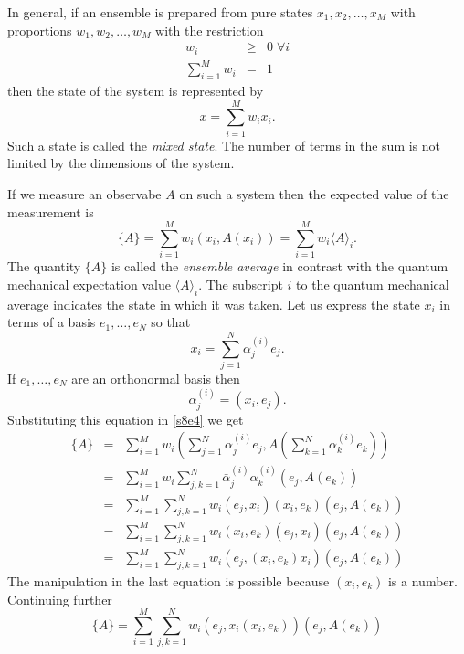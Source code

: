 \documentclass{article}
\numberwithin{equation}{section}
\newcommand{\qev}[1]{\langle #1 \rangle} %
\newcommand{\eav}[1]{\{ #1 \}}           %
\theoremstyle{plain}
\numberwithin{thm}{section}
\theoremstyle{plain}
\numberwithin{prop}{section}
\theoremstyle{definition}
\numberwithin{defn}{section}
\theoremstyle{remark}
\begin{document}
In general, if an ensemble is prepared from pure states $x_1, x_2, \ldots, x_M$
with proportions $w_1, w_2, \ldots, w_M$ with the restriction 
\begin{eqnarray}
w_i &\ge& 0 \;\forall i \label{s8e1} \\
\sum_{i=1}^M w_i &=& 1 \label{s8e2}
\end{eqnarray}
then the state of the system is represented by
\begin{equation}\label{s8e3}
x = \sum_{i=1}^M w_i x_i.
\end{equation}
Such a state is called the \emph{mixed state}. The number of terms in the sum
is not limited by the dimensions of the system.

If we measure an observabe $A$ on such a system then the expected value of the
measurement is
\begin{equation}\label{s8e4}
\eav{A} = \sum_{i=1}^Mw_i(x_i, A(x_i)) = \sum_{i=1}^Mw_i\qev{A}_i.
\end{equation}
The quantity $\eav{A}$ is called the \emph{ensemble average} in contrast with 
the quantum mechanical expectation value $\qev{A}_i$. The subscript $i$ to the
quantum mechanical average indicates the state in which it was taken. Let us 
express the state $x_i$ in terms of a basis $e_1, \ldots, e_N$ so that
\begin{equation}\label{s8e5}
x_i = \sum_{j=1}^N \alpha_j^{(i)} e_j.
\end{equation}
If $e_1, \ldots, e_N$ are an orthonormal basis then
\begin{equation}\label{s8e6}
\alpha_j^{(i)} = (x_i, e_j).
\end{equation}
Substituting this equation in \eqref{s8e4} we get
\begin{eqnarray*}
\eav{A} &=& \sum_{i=1}^Mw_i\left(\sum_{j=1}^N \alpha_j^{(i)} e_j, 
     A\left(\sum_{k=1}^N \alpha_k^{(i)} e_k\right)\right) \\
 &=& \sum_{i=1}^M w_i \sum_{j,k=1}^N\bar{\alpha}_j^{(i)}\alpha_k^{(i)}
     (e_j, A(e_k)) \\
 &=& \sum_{i=1}^M\sum_{j,k=1}^Nw_i(e_j, x_i)(x_i,e_k)(e_j, A(e_k)) \\
 &=& \sum_{i=1}^M\sum_{j,k=1}^Nw_i(x_i,e_k)(e_j, x_i)(e_j, A(e_k)) \\
 &=& \sum_{i=1}^M\sum_{j,k=1}^Nw_i\left(e_j, (x_i,e_k)x_i\right)(e_j,A(e_k))
\end{eqnarray*}
The manipulation in the last equation is possible because $(x_i, e_k)$ is a
number. Continuing further
\begin{equation}\label{s8e7}
\eav{A} = \sum_{i=1}^M\sum_{j,k=1}^Nw_i
     \left(e_j, x_i(x_i,e_k)\right)(e_j,A(e_k)) 
\end{equation}
\end{document}
